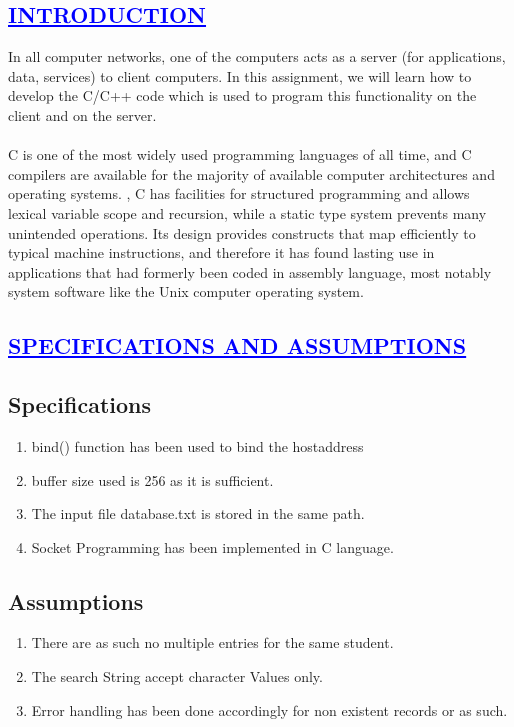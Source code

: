 \documentclass[a4paper,12pt]{report}
\begin{document}
\begin{center}
\chapter{\textcolor{blue}{\underline {INTRODUCTION}}}
\end{center}
\noindent  In all computer networks, one of the computers acts as a server (for applications, data, services)
to client computers. In this assignment, we will learn how to develop the C/C++ code which is
used to program this functionality on the client and on the server.\\\\
	  C is one of the most widely used programming languages of all time, and C compilers are available for the majority of available computer architectures and operating systems.
, C has facilities for structured programming and allows lexical variable scope and recursion, while a static type system prevents many unintended operations. Its design provides constructs that map efficiently to typical machine instructions,
and therefore it has found lasting use in applications that had formerly been coded in assembly language, most notably system software like the Unix computer operating system.
	  
\begin{center}
\chapter{\textcolor{blue}{\underline {SPECIFICATIONS AND ASSUMPTIONS}}}
\end{center}
\section*{Specifications}
\begin{enumerate}
 
\item bind() function has been used to bind the hostaddress
\item buffer size used is 256 as it is sufficient.
\item The input file database.txt is stored in the same path.
\item Socket Programming has been implemented in C language.
\end{enumerate}

\section*{Assumptions}
\begin{enumerate}
\item There are as such no multiple entries for the same student.
\item The search String accept character Values only.
\item Error handling has been done accordingly for non existent records or as such.
\end{enumerate}
 
\end{document}
